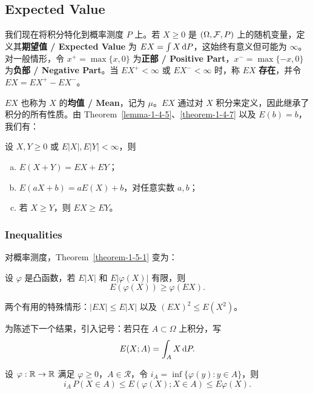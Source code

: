 \subsection{Expected Value}

我们现在将积分特化到概率测度 $P$ 上。若 $X \ge 0$ 是 $(\Omega, \mathcal{F}, P)$ 上的随机变量，定义其{\normalfont\bfseries 期望值 / Expected Value} 为 $EX = \int X \,\mathrm{d} P$，这始终有意义但可能为 $\infty$。对一般情形，令 $x^+ = \max\{x,0\}$ 为{\normalfont\bfseries 正部 / Positive Part}，$x^- = \max\{-x,0\}$ 为{\normalfont\bfseries 负部 / Negative Part}。当 $EX^+ < \infty$ 或 $EX^- < \infty$ 时，称 $EX$ {\normalfont\bfseries 存在}，并令 $EX = EX^+ - EX^-$。

$EX$ 也称为 $X$ 的{\normalfont\bfseries 均值 / Mean}，记为 $\mu$。$EX$ 通过对 $X$ 积分来定义，因此继承了积分的所有性质。由 Theorem~\ref{lemma-1-4-5}、\ref{theorem-1-4-7} 以及 $E(b) = b$，我们有：

\begin{theorem}\label{theorem-1-6-1}
    设 $X, Y \ge 0$ 或 $E|X|, E|Y| < \infty$，则
    \begin{enumerate}[(a)]
        \item $E(X+Y) = EX + EY$；
        \item $E(aX+b) = aE(X) + b$，对任意实数 $a,b$；
        \item 若 $X \ge Y$，则 $EX \ge EY$。
    \end{enumerate}
\end{theorem}

\subsubsection{Inequalities}

对概率测度，Theorem~\ref{theorem-1-5-1} 变为：

\begin{theorem}\label{theorem-1-6-2}
    设 $\varphi$ 是凸函数，若 $E|X|$ 和 $E|\varphi(X)|$ 有限，则
    \[
        E(\varphi(X)) \ge \varphi(EX).
    \]
\end{theorem}

两个有用的特殊情形：$|EX| \le E|X|$ 以及 $(EX)^2 \le E(X^2)$。

为陈述下一个结果，引入记号：若只在 $A \subset \Omega$ 上积分，写
\[
    E(X; A) = \int_A X \,\mathrm{d} P.
\]

\begin{theorem}\label{theorem-1-6-4}
    设 $\varphi : \mathbb{R} \to \mathbb{R}$ 满足 $\varphi \ge 0$，$A \in \mathcal{R}$，令 $i_A = \inf\{\varphi(y) : y \in A\}$，则
    \[
        i_A \, P(X \in A) \le E(\varphi(X); X \in A) \le E\varphi(X).
    \]
\end{theorem}

